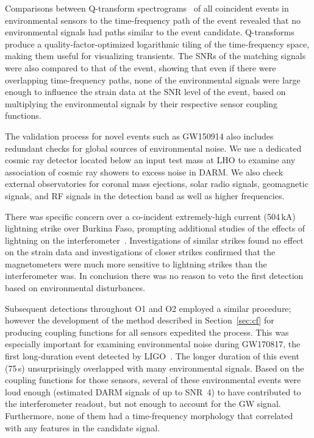 Comparisons between Q-transform spectrograms~\citep{Chatterji_2004} of all coincident events in environmental sensors to the time-frequency path of the event revealed that no environmental signals had paths similar to the event candidate.
Q-transforms produce a quality-factor-optimized logarithmic tiling of the time-frequency space, making them useful for visualizing transients.
The \acp{SNR} of the matching signals were also compared to that of the event, showing that even if there were overlapping time-frequency paths, none of the environmental signals were large enough to influence the strain data at the \ac{SNR} level of the event, based on multiplying the environmental signals by their respective sensor coupling functions.

The validation process for novel events such as GW150914 also includes redundant checks for global sources of environmental noise.
We use a dedicated cosmic ray detector located below an input test mass at \ac{LHO} to examine any association of cosmic ray showers to excess noise in \ac{DARM}.
We also check external observatories for coronal mass ejections, solar radio signals, geomagnetic signals, and \ac{RF} signals in the detection band as well as higher frequencies.

There was specific concern over a co-incident extremely-high current (504\,kA) lightning strike over Burkina Faso, prompting additional studies of the effects of lightning on the interferometer~\citep{Schofield_lightning}.
Investigations of similar strikes found no effect on the strain data and investigations of closer strikes confirmed that the magnetometers were much more sensitive to lightning strikes than the interferometer was.
In conclusion there was no reason to veto the first detection based on environmental disturbances.

Subsequent detections throughout \ac{O1} and \ac{O2} employed a similar procedure; however the development of the method described in Section~\ref{sec:cf} for producing coupling functions for all sensors expedited the process.
This was especially important for examining environmental noise during GW170817, the first long-duration event detected by \ac{LIGO}~\citep{gw170817, Schofield_170817}.
The longer duration of this event (75\,s) unsurprisingly overlapped with many environmental signals.
Based on the coupling functions for those sensors, several of these environmental events were loud enough (estimated \ac{DARM} signals of up to SNR~4) to have contributed to the interferometer readout, but not enough to account for the \ac{GW} signal.
Furthermore, none of them had a time-frequency morphology that correlated with any features in the candidate signal.

